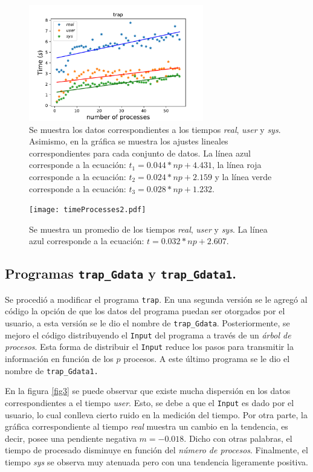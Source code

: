 \documentclass[twocolumn]{article}
\begin{document}
\begin{figure}
    \centering
    \includegraphics[width=3in]{fig_1.pdf}
    \caption{Se muestra los datos correspondientes a los tiempos \textit{real}, \textit{user} y \textit{sys}. Asimismo, en la gráfica se muestra los ajustes lineales correspondientes para cada conjunto de datos. La línea azul corresponde a la ecuación: $t_1=0.044*np + 4.431$, la línea roja corresponde a la ecuación: $t_2=0.024*np + 2.159$ y la línea verde corresponde a la ecuación: $t_3 = 0.028*np + 1.232$.} \label{fig1}
\end{figure}

\begin{figure}
    \centering
    \texttt{[image: timeProcesses2.pdf]}
    \caption{Se muestra un promedio de los tiempos \textit{real}, \textit{user} y \textit{sys}. La línea azul corresponde a la ecuación: $t =0.032*np + 2.607$. } \label{fig2}
\end{figure}

\subsection{Programas \texttt{trap\_Gdata} y \texttt{trap\_Gdata1}.}

Se procedió a modificar el programa \texttt{trap}. En una segunda versión se le agregó al código la opción de que los datos del programa puedan ser otorgados por el usuario, a esta versión se le dio el nombre de \texttt{trap\_Gdata}. Posteriormente, se mejoro el código distribuyendo el \texttt{Input} del programa a través de un \textit{árbol de procesos}. Esta forma de distribuir el \texttt{Input} reduce los pasos para transmitir la información en función de los $p$ procesos. A este último programa se le dio el nombre de \texttt{trap\_Gdata1.}

En la figura \ref{fig3} se puede observar que existe mucha dispersión en los datos correspondientes a el tiempo \textit{user}. Esto, se debe a que el \texttt{Input} es dado por el usuario, lo cual conlleva cierto ruido en la medición del tiempo. Por otra parte, la gráfica correspondiente al tiempo \textit{real} muestra un cambio en la tendencia, es decir, posee una pendiente negativa $m=-0.018$. Dicho con otras palabras, el tiempo de procesado disminuye en función del \textit{número de procesos}. Finalmente, el tiempo \textit{sys} se observa muy atenuada pero con una tendencia ligeramente positiva.
\end{document}
